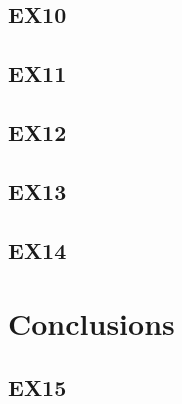 \documentclass{article}
\begin{document}
	\subsection{EX10}
	
	\subsection{EX11}
		
	\subsection{EX12}
	
	\subsection{EX13}
	
	\subsection{EX14}
	
	\section{Conclusions}
	
	\subsection{EX15}
\end{document}
